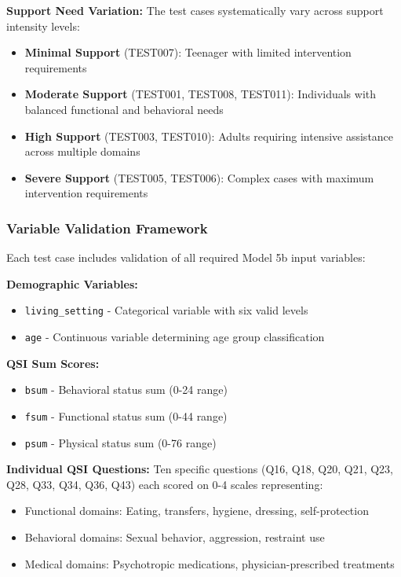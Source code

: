 \textbf{Support Need Variation:}
The test cases systematically vary across support intensity levels:
\begin{itemize}
    \item \textbf{Minimal Support} (TEST007): Teenager with limited intervention requirements
    \item \textbf{Moderate Support} (TEST001, TEST008, TEST011): Individuals with balanced functional and behavioral needs
    \item \textbf{High Support} (TEST003, TEST010): Adults requiring intensive assistance across multiple domains
    \item \textbf{Severe Support} (TEST005, TEST006): Complex cases with maximum intervention requirements
\end{itemize}

\subsubsection{Variable Validation Framework}

Each test case includes validation of all required Model 5b input variables:

\textbf{Demographic Variables:}
\begin{itemize}
    \item \texttt{living\_setting} - Categorical variable with six valid levels
    \item \texttt{age} - Continuous variable determining age group classification
\end{itemize}

\textbf{QSI Sum Scores:}
\begin{itemize}
    \item \texttt{bsum} - Behavioral status sum (0-24 range)
    \item \texttt{fsum} - Functional status sum (0-44 range) 
    \item \texttt{psum} - Physical status sum (0-76 range)
\end{itemize}

\textbf{Individual QSI Questions:}
Ten specific questions (Q16, Q18, Q20, Q21, Q23, Q28, Q33, Q34, Q36, Q43) each scored on 0-4 scales representing:
\begin{itemize}
    \item Functional domains: Eating, transfers, hygiene, dressing, self-protection
    \item Behavioral domains: Sexual behavior, aggression, restraint use
    \item Medical domains: Psychotropic medications, physician-prescribed treatments
\end{itemize}

